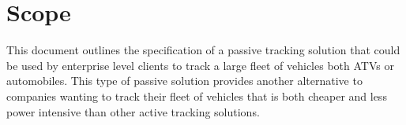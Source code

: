 \documentclass[11pt]{article}
\begin{document}
% 
%
%


\thispagestyle{empty}
\tableofcontents
\vspace{2cm}

\thispagestyle{empty}
\listoffigures
\pagebreak


\section{Scope}
This document outlines the specification of a passive tracking solution that could be used by enterprise level clients to track a 
large fleet of vehicles both ATVs or automobiles. This type of passive solution provides another alternative to companies wanting to track 
their fleet of vehicles that is both cheaper and less power intensive than other active tracking solutions.
\end{document}
